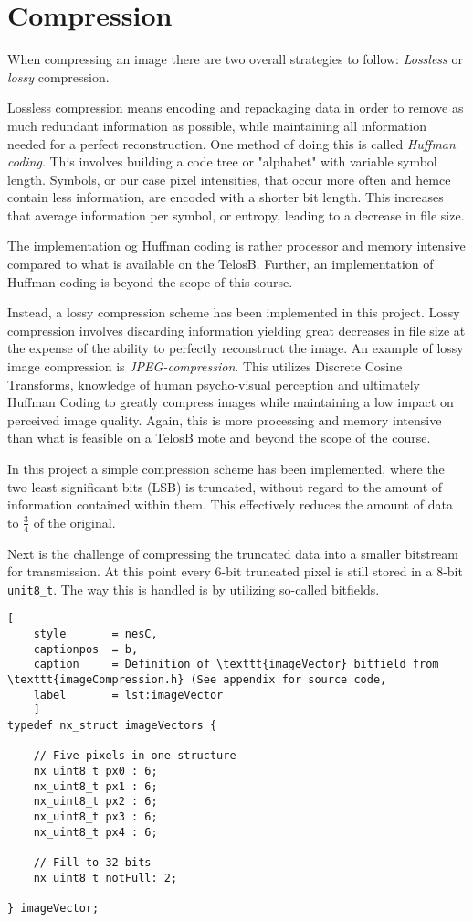 \section{Compression}
When compressing an image there are two overall strategies to follow:
\emph{Lossless} or \emph{lossy} compression.

Lossless compression means encoding and repackaging data in order to remove as much redundant information as possible, while maintaining all information needed for a perfect reconstruction. 
One method of doing this is called \emph{Huffman coding}.
This involves building a code tree or "alphabet" with variable symbol length.
Symbols, or our case pixel intensities, that occur more often and hemce contain less information, are encoded with a shorter bit length. 
This increases that average information per symbol, or entropy, leading to a decrease in file size.

The implementation og Huffman coding is rather processor and memory intensive compared to what is available on the TelosB.
Further, an implementation of Huffman coding is beyond the scope of this course.

Instead, a lossy compression scheme has been implemented in this project.
Lossy compression involves discarding information yielding great decreases in file size at the expense of the ability to perfectly reconstruct the image.
An example of lossy image compression is \emph{JPEG-compression}.
This utilizes Discrete Cosine Transforms, knowledge of human psycho-visual perception and ultimately Huffman Coding to greatly compress images while maintaining a low impact on perceived image quality.
Again, this is more processing and memory intensive than what is feasible on a TelosB mote and beyond the scope of the course.

In this project a simple compression scheme has been implemented, where the two least significant  bits (LSB) is truncated, without regard to the amount of information contained within them.
This effectively reduces the amount of data to $ \frac{3}{4} $ of the original. 

Next is the challenge of compressing the truncated data into a smaller bitstream for transmission.
At this point every 6-bit truncated pixel is still stored in a 8-bit \texttt{unit8\_t}.
The way this is handled is by utilizing so-called bitfields.

\begin{lstlisting}[
	style		= nesC, 
	captionpos	= b, 
	caption		= Definition of \texttt{imageVector} bitfield from \texttt{imageCompression.h} (See appendix for source code,
	label		= lst:imageVector
	]
typedef nx_struct imageVectors {
	
	// Five pixels in one structure
	nx_uint8_t px0 : 6;
	nx_uint8_t px1 : 6;
	nx_uint8_t px2 : 6;
	nx_uint8_t px3 : 6;
	nx_uint8_t px4 : 6;
	
	// Fill to 32 bits
	nx_uint8_t notFull: 2;
	
} imageVector;

\end{lstlisting}

